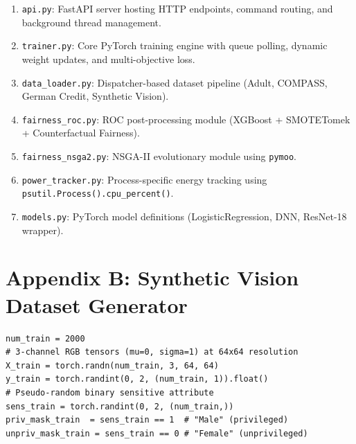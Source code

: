 \documentclass[12pt,a4paper]{article}
\begin{document}
\begin{enumerate}
    \item \texttt{api.py}: FastAPI server hosting HTTP endpoints, command routing, and background thread management.
    \item \texttt{trainer.py}: Core PyTorch training engine with queue polling, dynamic weight updates, and multi-objective loss.
    \item \texttt{data\_loader.py}: Dispatcher-based dataset pipeline (Adult, COMPASS, German Credit, Synthetic Vision).
    \item \texttt{fairness\_roc.py}: ROC post-processing module (XGBoost + SMOTETomek + Counterfactual Fairness).
    \item \texttt{fairness\_nsga2.py}: NSGA-II evolutionary module using \texttt{pymoo}.
    \item \texttt{power\_tracker.py}: Process-specific energy tracking using \texttt{psutil.Process().cpu\_percent()}.
    \item \texttt{models.py}: PyTorch model definitions (LogisticRegression, DNN, ResNet-18 wrapper).
\end{enumerate}

\section{Appendix B: Synthetic Vision Dataset Generator}

\begin{verbatim}
num_train = 2000
# 3-channel RGB tensors (mu=0, sigma=1) at 64x64 resolution
X_train = torch.randn(num_train, 3, 64, 64)
y_train = torch.randint(0, 2, (num_train, 1)).float()
# Pseudo-random binary sensitive attribute
sens_train = torch.randint(0, 2, (num_train,))
priv_mask_train  = sens_train == 1  # "Male" (privileged)
unpriv_mask_train = sens_train == 0 # "Female" (unprivileged)
\end{verbatim}
\end{document}
